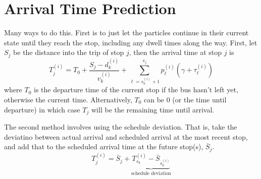 \documentclass[10pt,a4paper]{article}
\begin{document}
\section{Arrival Time Prediction}
\label{sec:arrival_time}

Many ways to do this.
First is to just let the particles continue in their current state until they reach the stop,
including any dwell times along the way.
First, let $S_j$ be the distance into the trip of stop $j$, then the arrival time at stop $j$ is
\begin{equation}
  \label{eq:state_pred}
  T_j^{(i)} = T_0 + \frac{S_j - d_k^{(i)}}{v_k^{(i)}} + \sum_{\ell = s_k^{(i)} + 1}^{s_j} p_\ell^{(i)} (\gamma + \tau_\ell^{(i)})
\end{equation}
where $T_0$ is the departure time of the current stop if the bus hasn't left yet,
otherwise the current time.
Alternatively, $T_0$ can be 0 (or the time until departure) in which case $T_j$ will be 
the remaining time until arrival.


The second method involves using the schedule deviation.
That is, take the deviatino between actual arrival and scheduled arrival at the most recent stop,
and add that to the scheduled arrival time at the future stop(s), $\bar S_j$.
\begin{equation}
  \label{eq:sched_pred}
  T_j^{(i)} = \bar S_j + \underbrace{T_{s_k}^{(i)} - \bar S_{s_k^{(i)}}}_{\text{schedule deviation}}
\end{equation}
\end{document}

